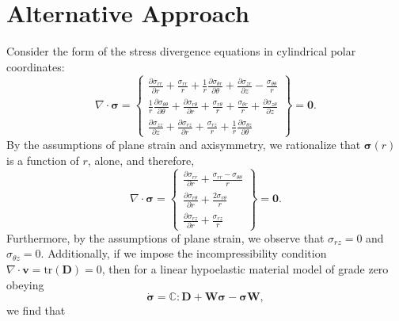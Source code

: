 \documentclass[12pt]{article}
\begin{document}
\section{Alternative Approach}

Consider the form of the stress divergence equations in cylindrical polar coordinates:
\begin{equation}
  \nabla \cdot \boldsymbol{\sigma} = \left\{ \begin{array}{c} \frac{\partial \sigma_{rr}}{\partial r} + \frac{\sigma_{rr}}{r} + \frac{1}{r} \frac{\partial \sigma_{\theta r}}{\partial \theta} + \frac{\partial \sigma_{z r}}{\partial z} - \frac{\sigma_{\theta \theta}}{r} \\
    \frac{1}{r} \frac{\partial \sigma_{\theta \theta}}{\partial \theta} + \frac{\partial \sigma_{r\theta}}{\partial r} + \frac{\sigma_{r\theta}}{r} + \frac{\sigma_{\theta r}}{r} + \frac{\partial \sigma_{z \theta}}{\partial z} \\
    \frac{\partial \sigma_{z z}}{\partial z} + \frac{\partial \sigma_{r z}}{\partial r} + \frac{\sigma_{r z}}{r} + \frac{1}{r} \frac{\partial \sigma_{\theta z}}{\partial \theta} \end{array} \right\} = \mathbf{0}.
\end{equation}
By the assumptions of plane strain and axisymmetry, we rationalize that $\boldsymbol{\sigma} (r)$ is a function of $r$, alone, and therefore,
\begin{equation}
  \nabla \cdot \boldsymbol{\sigma} = \left\{ \begin{array}{c} \frac{\partial \sigma_{rr}}{\partial r} + \frac{\sigma_{rr} - \sigma_{\theta \theta}}{r} \\
    \frac{\partial \sigma_{r\theta}}{\partial r} + \frac{2 \sigma_{r\theta}}{r} \\
    \frac{\partial \sigma_{r z}}{\partial r} + \frac{\sigma_{r z}}{r} \end{array} \right\} = \mathbf{0}.
\end{equation}
Furthermore, by the assumptions of plane strain, we observe that $\sigma_{rz} = 0$ and $\sigma_{\theta z} = 0$. Additionally, if we impose the incompressibility condition $\nabla \cdot \mathbf{v} = \text{tr} (\mathbf{D}) = 0$, then for a linear hypoelastic material model of grade zero obeying
\begin{equation}
  \dot{\boldsymbol{\sigma}} = \mathbb{C} : \mathbf{D} + \mathbf{W} \boldsymbol{\sigma} - \boldsymbol{\sigma} \mathbf{W},
\end{equation}
we find that
\end{document}
